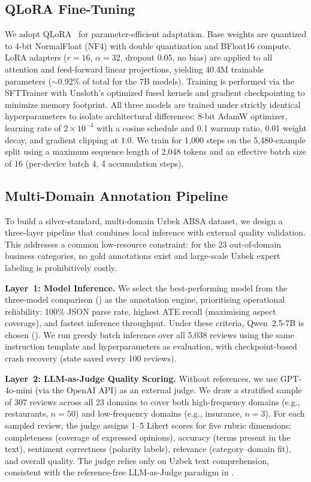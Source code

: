 \documentclass[computers,article,submit,pdftex,moreauthors]{Definitions/mdpi}
\begin{document}
\subsection{QLoRA Fine-Tuning}
\label{sec:meth_qlora}

We adopt QLoRA~\cite{10.5555/3666122.3666563} for parameter-efficient adaptation. Base weights are quantized to 4-bit NormalFloat (NF4) with double quantization and BFloat16 compute. LoRA adapters ($r{=}16$, $\alpha{=}32$, dropout $0.05$, no bias) are applied to all attention and feed-forward linear projections, yielding 40.4M trainable parameters ($\sim$0.92\% of total for the 7B models). Training is performed via the SFTTrainer with Unsloth's optimized fused kernels and gradient checkpointing to minimize memory footprint. All three models are trained under strictly identical hyperparameters to isolate architectural differences: 8-bit AdamW optimizer, learning rate of $2{\times}10^{-4}$ with a cosine schedule and 0.1 warmup ratio, 0.01 weight decay, and gradient clipping at 1.0. We train for 1{,}000 steps on the 5{,}480-example split using a maximum sequence length of 2{,}048 tokens and an effective batch size of 16 (per-device batch 4, 4 accumulation steps).
\subsection{Multi-Domain Annotation Pipeline}
\label{sec:meth_pipeline}

To build a silver-standard, multi-domain Uzbek ABSA dataset, we design a three-layer pipeline that combines local inference with external quality validation. This addresses a common low-resource constraint: for the 23 out-of-domain business categories, no gold annotations exist and large-scale Uzbek expert labeling is prohibitively costly.

\textbf{Layer~1: Model Inference.} We select the best-performing model from the three-model comparison () as the annotation engine, prioritising operational reliability: 100\% JSON parse rate, highest ATE recall (maximising aspect coverage), and fastest inference throughput. Under these criteria, Qwen~2.5-7B is chosen (). We run greedy batch inference over all 5{,}038 reviews using the same instruction template and hyperparameters as evaluation, with checkpoint-based crash recovery (state saved every 100 reviews).

\textbf{Layer~2: LLM-as-Judge Quality Scoring.} Without references, we use GPT-4o-mini (via the OpenAI API) as an external judge. We draw a stratified sample of 307 reviews across all 23 domains to cover both high-frequency domains (e.g., restaurants, $n{=}50$) and low-frequency domains (e.g., insurance, $n{=}3$). For each sampled review, the judge assigns 1--5 Likert scores for five rubric dimensions: completeness (coverage of expressed opinions), accuracy (terms present in the text), sentiment correctness (polarity labels), relevance (category--domain fit), and overall quality. The judge relies only on Uzbek text comprehension, consistent with the reference-free LLM-as-Judge paradigm in .
\end{document}
